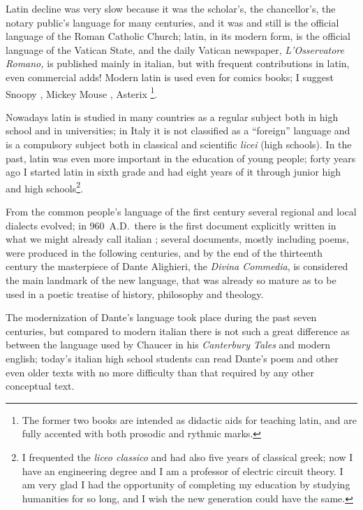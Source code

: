 \documentclass{ltugboat}
\begin{document}
Latin  decline was very slow because it was the scholar's, the chancellor's,
the notary public's language for many centuries, and it was and still is the
official  language  of the Roman Catholic Church; latin, in its modern form,
is the official language  of  the  Vatican  State,  and  the  daily  Vatican
newspaper,  {\it  L'Osservatore Romano,} is published mainly in italian, but
with frequent contributions in latin, even commercial adds! Modern latin  is
used  even  for  comics  books; I suggest Snoopy \cite{snoopy}, Mickey Mouse
\cite{MMouse}, Asterix  \cite{asterix}\footnote{The  former  two  books  are
intended  as  didactic  aids for teaching latin, and are fully accented with
both prosodic and rythmic marks.}.

Nowadays  latin  is  studied  in many countries as a regular subject both in
high school and in  universities;  in  Italy  it  is  not  classified  as  a
``foreign''  language  and  is  a  compulsory  subject both in classical and
scientific {\it licei} (high schools). In the  past,  latin  was  even  more
important  in the education of young people; forty years ago I started latin
in sixth grade and had eight years  of  it  through  junior  high  and  high
schools\footnote{I  frequented  the  {\it  liceo classico} and had also five
years of classical greek; now I have  an  engineering  degree  and  I  am  a
professor  of  electric circuit theory. I am very glad I had the opportunity
of completing my education by studying humanities for so long,  and  I  wish
the new generation could have the same.}.

From  the common people's language of the first century several regional and
local dialects evolved; in 960~A.D.\ there is the first document  explicitly
written  in  what  we  might already call italian \cite{migliorini}; several
documents, mostly including poems, were produced in the following centuries,
and by the end of the thirteenth century the masterpiece of Dante Alighieri,
the {\it Divina Commedia}, is  considered  the  main  landmark  of  the  new
language,  that  was already so mature as to be used in a poetic treatise of
history, philosophy and theology.

The  modernization  of  Dante's  language  took  place during the past seven
centuries, but compared  to  modern  italian  there  is  not  such  a  great
difference  as  between  the language used by Chaucer in his {\it Canterbury
Tales} and modern english; today's italian high  school  students  can  read
Dante's  poem  and  other even older texts with no more difficulty than that
required by any other conceptual text.
\end{document}
